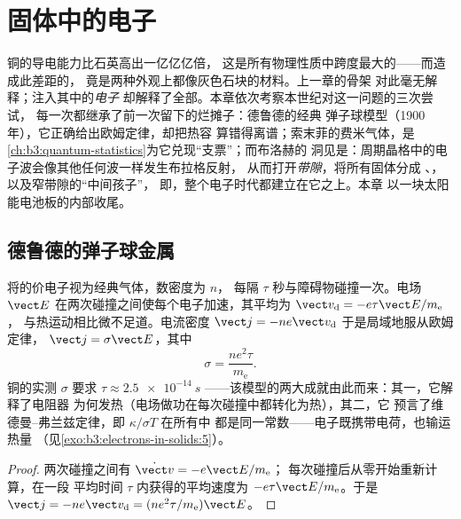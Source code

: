\chapter{固体中的电子}\label{ch:b3:electrons-in-solids}


铜的导电能力比石英高出一亿亿亿倍，
这是所有物理性质中跨度最大的——而造成此差距的，
竟是两种外观上都像灰色石块的材料。上一章的骨架
对此毫无解释；注入其中的\emph{电子}
却解释了全部。本章依次考察本世纪对这一问题的三次尝试，
每一次都继承了前一次留下的烂摊子：德鲁德的经典
弹子球模型（1900 年），它正确给出欧姆定律，却把热容
算错得离谱；索末菲的费米气体，是
\cref{ch:b3:quantum-statistics}为它兑现“支票”；而布洛赫的
洞见是：周期晶格中的电子波会像其他任何波一样发生布拉格反射，
从而打开\emph{带隙}，将所有固体分成
、，以及窄带隙的“中间孩子”，
即，整个电子时代都建立在它之上。本章
以一块太阳能电池板的内部收尾。

\section{德鲁德的弹子球金属}

\begin{proposition}[德鲁德电导率]\label{prop:b3:electrons-in-solids:drude}
将的价电子视为经典气体，数密度为 $n$，
每隔 $\tau$ 秒与障碍物碰撞一次。电场 $\vect E$
在两次碰撞之间使每个电子加速，其平均\emph{}为 $\vect v_{\text{d}} = -e\tau\vect E/m_{\text{e}}$，
与热运动相比微不足道。电流密度 $\vect j =
-ne\vect v_{\text{d}}$ 于是局域地服从欧姆定律，
$\vect j = \sigma\vect E$，其中
\[
\sigma = \frac{ne^2\tau}{m_{\text{e}}} .
\]
铜的实测 $\sigma$ 要求 $\tau \approx \qty{2.5e-14}{s}$
——该模型的两大成就由此而来：其一，它解释了电阻器
为何发热（电场做功在每次碰撞中都转化为热），其二，它
预言了维德曼–弗兰兹定律，即 $\kappa/\sigma T$ 在所有中
都是同一常数——电子既携带电荷，也输运热量
（见\cref{exo:b3:electrons-in-solids:5}）。
\end{proposition}

\begin{proof}
两次碰撞之间有 $\dot{\vect v} = -e\vect E/m_{\text{e}}$；
每次碰撞后从零开始重新计算，在一段
平均时间 $\tau$ 内获得的平均速度为 $-e\tau\vect E/m_{\text{e}}$。于是 $\vect j =
-ne\vect v_{\text{d}} = (ne^2\tau/m_{\text{e}})\vect E$。
\end{proof}


